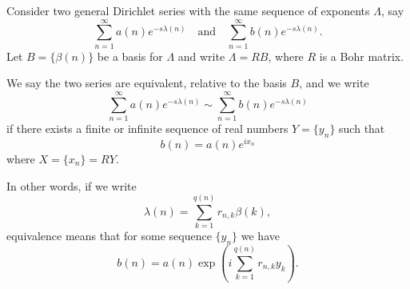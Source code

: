 Consider two general Dirichlet series with the same sequence of exponents $\Lambda$, say
$$\sum_{n=1}^{\infty} a(n)e^{-s\lambda(n)} \quad \text{and} \quad \sum_{n=1}^{\infty} b(n)e^{-s\lambda(n)}.$$
Let $B = \{\beta(n)\}$ be a basis for $\Lambda$ and write $\Lambda = RB$, where $R$ is a Bohr matrix.

We say the two series are equivalent, relative to the basis $B$, and we write
$$\sum_{n=1}^{\infty} a(n)e^{-s\lambda(n)} \sim \sum_{n=1}^{\infty} b(n)e^{-s\lambda(n)}$$
if there exists a finite or infinite sequence of real numbers $Y = \{y_n\}$ such that
$$b(n) = a(n)e^{ix_n}$$
where $X = \{x_n\} = RY$.

In other words, if we write
$$\lambda(n) = \sum_{k=1}^{q(n)} r_{n,k}\beta(k),$$
equivalence means that for some sequence $\{y_n\}$ we have
$$b(n) = a(n) \exp\left(i \sum_{k=1}^{q(n)} r_{n,k}y_k\right).$$
